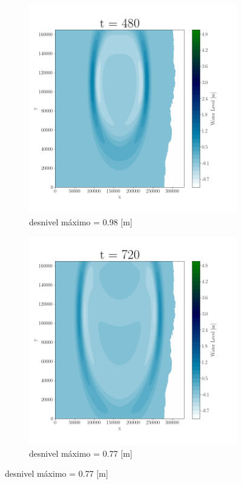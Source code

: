 \begin{figure}[H]
\begin{subfigure}[b]{.4\linewidth}
\includegraphics[width=\linewidth]{Figures/Plots/Valpo3.png}
\caption{desnivel máximo = 0.98 [m]}
\end{subfigure}
\begin{subfigure}[b]{.4\linewidth}
\includegraphics[width=\linewidth]{Figures/Plots/Valpo4.png}
\caption{desnivel máximo = 0.77 [m]}
\end{subfigure}


\end{figure}
